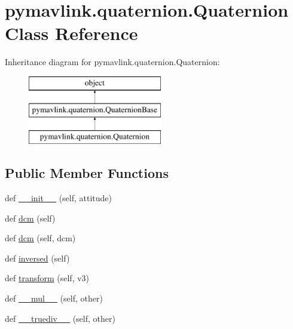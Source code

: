 \hypertarget{classpymavlink_1_1quaternion_1_1Quaternion}{}\section{pymavlink.\+quaternion.\+Quaternion Class Reference}
\label{classpymavlink_1_1quaternion_1_1Quaternion}
Inheritance diagram for pymavlink.\+quaternion.\+Quaternion\+:\begin{figure}[H]
\begin{center}
\leavevmode
\includegraphics[height=3.000000cm]{classpymavlink_1_1quaternion_1_1Quaternion}
\end{center}
\end{figure}
\subsection*{Public Member Functions}
\begin{DoxyCompactItemize}
\item 
def \mbox{\hyperlink{classpymavlink_1_1quaternion_1_1Quaternion_ad82c01c2f6c5edc2e25d367624f565c5}{\+\_\+\+\_\+init\+\_\+\+\_\+}} (self, attitude)
\item 
def \mbox{\hyperlink{classpymavlink_1_1quaternion_1_1Quaternion_a8c596178af38be093dd787c609d7da09}{dcm}} (self)
\item 
def \mbox{\hyperlink{classpymavlink_1_1quaternion_1_1Quaternion_a2223bcf5392e9fc3980e012074318707}{dcm}} (self, dcm)
\item 
def \mbox{\hyperlink{classpymavlink_1_1quaternion_1_1Quaternion_a0dd030159c7d726fad2cb12fd4c3983a}{inversed}} (self)
\item 
def \mbox{\hyperlink{classpymavlink_1_1quaternion_1_1Quaternion_a79b86f00f3500a6c34fa3a099f3714f7}{transform}} (self, v3)
\item 
def \mbox{\hyperlink{classpymavlink_1_1quaternion_1_1Quaternion_af3d7ea873b5cc8bea69d2664b8e6dcc9}{\+\_\+\+\_\+mul\+\_\+\+\_\+}} (self, other)
\item 
def \mbox{\hyperlink{classpymavlink_1_1quaternion_1_1Quaternion_a768c82f6b6fbb4e9c3a496e494a0c587}{\+\_\+\+\_\+truediv\+\_\+\+\_\+}} (self, other)
\end{DoxyCompactItemize}
